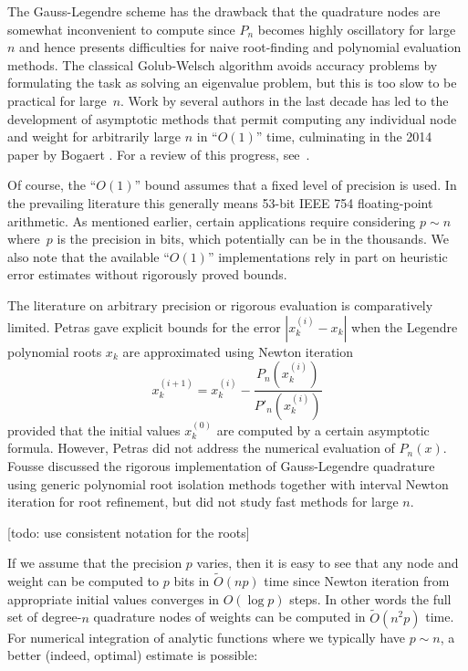 \documentclass[11pt,a4paper]{article}
\begin{document}
The Gauss-Legendre scheme has the drawback
that the quadrature nodes are
somewhat inconvenient to compute since $P_n$
becomes highly oscillatory for large $n$ and hence presents difficulties
for naive root-finding and polynomial evaluation methods.
The classical Golub-Welsch algorithm avoids accuracy problems
by formulating the task as solving an eigenvalue problem,
but this is too slow to be practical for large~$n$.
Work by several authors in the last decade has led to
the development of asymptotic methods
that permit computing any individual node and weight for arbitrarily large $n$
in ``$O(1)$'' time, culminating in the 2014 paper by Bogaert \cite{bogaert2014iteration}.
For a review of this progress, see~\cite{townsend2015race}.

Of course, the ``$O(1)$'' bound assumes that a fixed
level of precision is used. In the prevailing literature
this generally means 53-bit IEEE 754 floating-point arithmetic.
As mentioned earlier, certain applications require
considering $p \sim n$ where~$p$ is the precision in bits,
which potentially can be in the thousands.
We also note that the available ``$O(1)$'' implementations rely in part
on heuristic error estimates without rigorously proved bounds.

The literature on arbitrary precision or rigorous evaluation
is comparatively limited.
Petras \cite{petras1999computation} gave explicit
bounds for the error $|x_k^{(i)} - x_k|$ when
the Legendre polynomial roots $x_k$ are approximated using Newton iteration
$$x^{(i+1)}_k = x^{(i)}_k - \frac{P_n(x^{(i)}_k)}{P'_n(x^{(i)}_k)}$$
provided that the initial values $x^{(0)}_k$
are computed by a certain asymptotic formula.
However, Petras did not address the numerical evaluation of $P_n(x)$.
Fousse \cite{fousse2007accurate} discussed the rigorous implementation
of Gauss-Legendre quadrature
using generic polynomial root isolation methods together with interval Newton iteration
for root refinement,
but did not study fast methods for large $n$.

[todo: use consistent notation for the roots]

If we assume that the precision $p$ varies,
then it is easy to see that any node and weight
can be computed to $p$ bits in $\widetilde{O}(n p)$ time
since Newton iteration from appropriate
initial values converges in $O(\log p)$ steps.
In other words the
full set of degree-$n$ quadrature nodes of weights
can be computed in $\widetilde{O}(n^2 p)$ time.
For numerical integration of analytic functions
where we typically have $p \sim n$, a better (indeed, optimal) estimate is possible:
\end{document}
